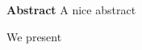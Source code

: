 \documentclass[11pt,a4paper]{article}
\begin{document}
\vspace{0.1cm}

\begin{center}
{\bf \large Abstract}
A nice abstract

\end{center}


We present
%

\clearpage

\tableofcontents

\clearpage












\end{document}
